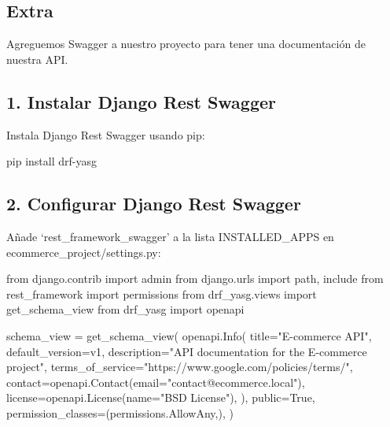 \documentclass[
  a4paper,
  DIV=11,
  numbers=noendperiod,
  onepage,
  openany]{scrreprt}
\newenvironment{Shaded}{\begin{snugshade}}{\end{snugshade}}
\newcommand{\ExtensionTok}[1]{\textcolor[rgb]{0.00,0.23,0.31}{#1}}
\newcommand{\ImportTok}[1]{\textcolor[rgb]{0.00,0.46,0.62}{#1}}
\newcommand{\NormalTok}[1]{\textcolor[rgb]{0.00,0.23,0.31}{#1}}
\newcommand{\OperatorTok}[1]{\textcolor[rgb]{0.37,0.37,0.37}{#1}}
\newcommand{\StringTok}[1]{\textcolor[rgb]{0.13,0.47,0.30}{#1}}
\newcommand{\VariableTok}[1]{\textcolor[rgb]{0.07,0.07,0.07}{#1}}
\begin{document}
\begin{tcolorbox}
\chapter{Extra}\label{extra}

Agreguemos Swagger a nuestro proyecto para tener una documentación de
nuestra API.

\section{1. Instalar Django Rest
Swagger}\label{instalar-django-rest-swagger}

Instala Django Rest Swagger usando pip:

\begin{Shaded}
\begin{Highlighting}[]
\ExtensionTok{pip}\NormalTok{ install drf{-}yasg}
\end{Highlighting}
\end{Shaded}

\section{2. Configurar Django Rest
Swagger}\label{configurar-django-rest-swagger}

Añade `rest\_framework\_swagger' a la lista INSTALLED\_APPS en
ecommerce\_project/settings.py:

\begin{Shaded}
\begin{Highlighting}[]
\ImportTok{from}\NormalTok{ django.contrib }\ImportTok{import}\NormalTok{ admin}
\ImportTok{from}\NormalTok{ django.urls }\ImportTok{import}\NormalTok{ path, include}
\ImportTok{from}\NormalTok{ rest\_framework }\ImportTok{import}\NormalTok{ permissions}
\ImportTok{from}\NormalTok{ drf\_yasg.views }\ImportTok{import}\NormalTok{ get\_schema\_view}
\ImportTok{from}\NormalTok{ drf\_yasg }\ImportTok{import}\NormalTok{ openapi}

\NormalTok{schema\_view }\OperatorTok{=}\NormalTok{ get\_schema\_view(}
\NormalTok{    openapi.Info(}
\NormalTok{        title}\OperatorTok{=}\StringTok{"E{-}commerce API"}\NormalTok{,}
\NormalTok{        default\_version}\OperatorTok{=}\StringTok{\textquotesingle{}v1\textquotesingle{}}\NormalTok{,}
\NormalTok{        description}\OperatorTok{=}\StringTok{"API documentation for the E{-}commerce project"}\NormalTok{,}
\NormalTok{        terms\_of\_service}\OperatorTok{=}\StringTok{"https://www.google.com/policies/terms/"}\NormalTok{,}
\NormalTok{        contact}\OperatorTok{=}\NormalTok{openapi.Contact(email}\OperatorTok{=}\StringTok{"contact@ecommerce.local"}\NormalTok{),}
\NormalTok{        license}\OperatorTok{=}\NormalTok{openapi.License(name}\OperatorTok{=}\StringTok{"BSD License"}\NormalTok{),}
\NormalTok{    ),}
\NormalTok{    public}\OperatorTok{=}\VariableTok{True}\NormalTok{,}
\NormalTok{    permission\_classes}\OperatorTok{=}\NormalTok{(permissions.AllowAny,),}
\NormalTok{)}


\end{Highlighting}
\end{Shaded}
\end{tcolorbox}
\end{document}
